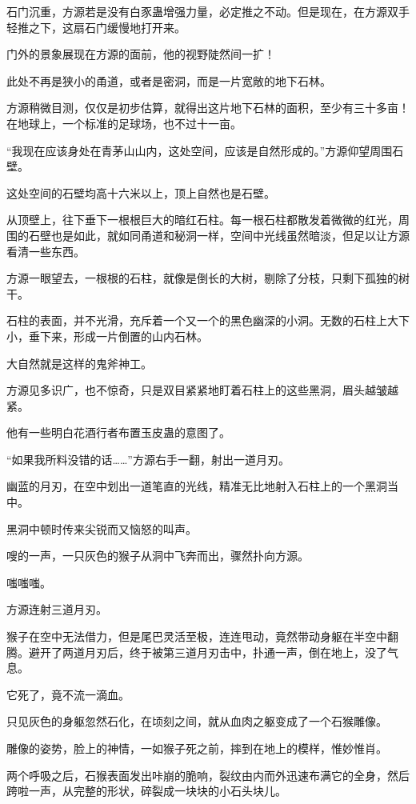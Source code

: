 \begin{this_body}
石门沉重，方源若是没有白豕蛊增强力量，必定推之不动。但是现在，在方源双手轻推之下，这扇石门缓慢地打开来。

门外的景象展现在方源的面前，他的视野陡然间一扩！

此处不再是狭小的甬道，或者是密洞，而是一片宽敞的地下石林。

方源稍微目测，仅仅是初步估算，就得出这片地下石林的面积，至少有三十多亩！在地球上，一个标准的足球场，也不过十一亩。

“我现在应该身处在青茅山山内，这处空间，应该是自然形成的。”方源仰望周围石壁。

这处空间的石壁均高十六米以上，顶上自然也是石壁。

从顶壁上，往下垂下一根根巨大的暗红石柱。每一根石柱都散发着微微的红光，周围的石壁也是如此，就如同甬道和秘洞一样，空间中光线虽然暗淡，但足以让方源看清一些东西。

方源一眼望去，一根根的石柱，就像是倒长的大树，剔除了分枝，只剩下孤独的树干。

石柱的表面，并不光滑，充斥着一个又一个的黑色幽深的小洞。无数的石柱上大下小，垂下来，形成一片倒置的山内石林。

大自然就是这样的鬼斧神工。

方源见多识广，也不惊奇，只是双目紧紧地盯着石柱上的这些黑洞，眉头越皱越紧。

他有一些明白花酒行者布置玉皮蛊的意图了。

“如果我所料没错的话……”方源右手一翻，射出一道月刃。

幽蓝的月刃，在空中划出一道笔直的光线，精准无比地射入石柱上的一个黑洞当中。

黑洞中顿时传来尖锐而又恼怒的叫声。

嗖的一声，一只灰色的猴子从洞中飞奔而出，骤然扑向方源。

嗤嗤嗤。

方源连射三道月刃。

猴子在空中无法借力，但是尾巴灵活至极，连连甩动，竟然带动身躯在半空中翻腾。避开了两道月刃后，终于被第三道月刃击中，扑通一声，倒在地上，没了气息。

它死了，竟不流一滴血。

只见灰色的身躯忽然石化，在顷刻之间，就从血肉之躯变成了一个石猴雕像。

雕像的姿势，脸上的神情，一如猴子死之前，摔到在地上的模样，惟妙惟肖。

两个呼吸之后，石猴表面发出咔崩的脆响，裂纹由内而外迅速布满它的全身，然后跨啦一声，从完整的形状，碎裂成一块块的小石头块儿。


\end{this_body}
